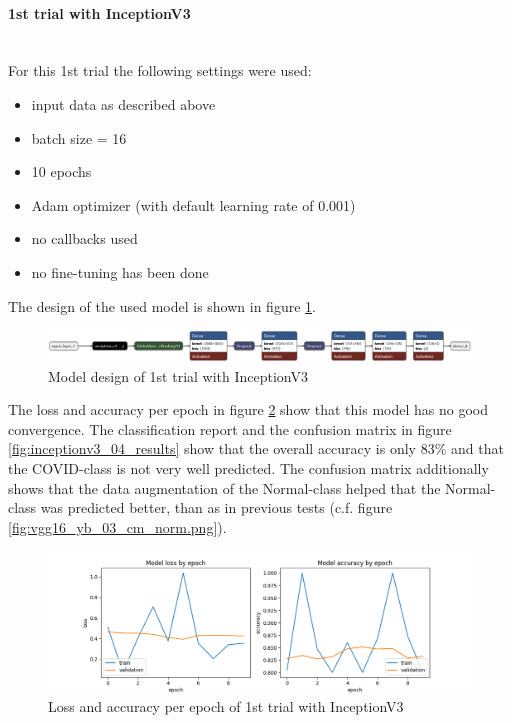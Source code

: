 \documentclass{article}
\begin{document}
\paragraph{1st trial with InceptionV3}\mbox{}\\
For this 1st trial the following settings were used: 
\begin{itemize}
\item input data as described above
\item batch size = 16
\item 10 epochs 
\item Adam optimizer (with default learning rate of 0.001)
\item no callbacks used
\item no fine-tuning has been done
\end{itemize}

The design of the used model is shown in figure \ref{fig:inceptionv3_04.keras_model_design}.
\begin{figure}[ht] %
    \centering
    \includegraphics[width=1.0\linewidth]{inceptionv3_04.keras_model_design_nice.png}
    \caption{Model design of 1st trial with InceptionV3}
    \label{fig:inceptionv3_04.keras_model_design}
\end{figure}

The loss and accuracy per epoch in figure \ref{fig:inceptionv3_04_loss_accuracy} show that this model has no good convergence. The classification report and the confusion matrix in figure \ref{fig:inceptionv3_04_results} show that the overall accuracy is only 83\% and that the COVID-class is not very well predicted. The confusion matrix additionally shows that the data augmentation of the Normal-class helped that the Normal-class was predicted better, than as in previous tests (c.f. figure \ref{fig:vgg16_yb_03_cm_norm.png}).

\begin{figure}[ht] %
    \centering
    \includegraphics[width=1.0\linewidth]{inceptionv3_04_loss_accuracy.png}
    \caption{Loss and accuracy per epoch of 1st trial with InceptionV3}
    \label{fig:inceptionv3_04_loss_accuracy}
\end{figure}
\end{document}
